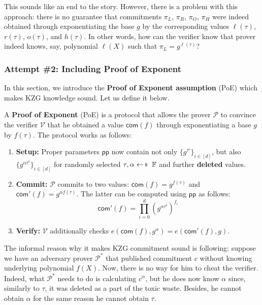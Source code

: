 \documentclass[../lecture-notes-148x210.tex]{subfiles}
\begin{document}
This sounds like an end to the story. However, there is a problem with this approach: there is no guarantee that commitments $\pi_L$, $\pi_R$, $\pi_O$, $\pi_H$ were indeed obtained through exponentiating the base $g$ by the corresponding values $\ell(\tau)$, $r(\tau)$, $o(\tau)$, and $h(\tau)$. In other words, how can the verifier know that prover indeed knows, say, polynomial $\ell(X)$ such that $\pi_L = g^{\ell(\tau)}$?

\subsubsection{Attempt \#2: Including Proof of Exponent}

In this section, we introduce the \textbf{Proof of Exponent assumption} (PoE) which makes KZG knowledge sound. Let us define it below.

\begin{definition}
    A \textbf{Proof of Exponent} (PoE) is a protocol that allows the prover $\mathcal{P}$ to convince the verifier $\mathcal{V}$ that he obtained a value $\mathsf{com}(f)$ through exponentiating a base $g$ by $f(\tau)$. The protocol works as follows:
    \begin{enumerate}
        \item \textbf{Setup:} Proper parameters $\mathsf{pp}$ now contain not only $\{g^{\tau^i}\}_{i \in [d]}$, but also $\{g^{\alpha\tau^i}\}_{i \in [d]}$ for randomly selected $\tau,\alpha \leftarrowS \mathbb{F}$ and further \textbf{deleted} values.
        \item \textbf{Commit:} $\mathcal{P}$ commits to two values: $\mathsf{com}(f) = g^{f(\tau)}$ and $\mathsf{com}'(f) = g^{\alpha f(\tau)}$. The latter can be computed using $\mathsf{pp}$ as follows:
        \begin{equation*}
            \mathsf{com}'(f) = \prod_{i=0}^d (g^{\alpha\tau^i})^{f_i}
        \end{equation*} 
        \item \textbf{Verify:} $\mathcal{V}$ additionally checks $e(\mathsf{com}(f),g^{\alpha}) = e(\mathsf{com}'(f), g)$.
    \end{enumerate}
\end{definition}

The informal reason why it makes KZG commitment sound is following: suppose we have an adversary prover $\mathcal{P}^*$ that published commitment $c$ without knowing underlying polynomial $f(X)$. Now, there is no way for him to cheat the verifier. 
Indeed, what $\mathcal{P}^*$ needs to do is calculating $c^{\alpha}$, but he does now know $\alpha$ since, similarly to $\tau$, it was deleted as a part of the toxic waste. Besides, he cannot obtain $\alpha$ for the same reason he cannot obtain $\tau$.
\end{document}
